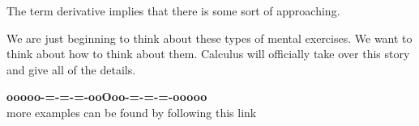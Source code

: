 \documentclass{ximera}
\begin{document}
The term derivative implies that there is some sort of approaching.


We are just beginning to think about these types of mental exercises. We want to think about how to think about them.  Calculus will officially take over this story and give all of the details.


















\begin{center}
\textbf{\textcolor{green!50!black}{ooooo-=-=-=-ooOoo-=-=-=-ooooo}} \\

more examples can be found by following this link\\ 

\end{center}
\end{document}
